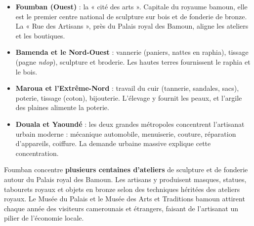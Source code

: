 \documentclass[11pt]{article}
\begin{document}
\begin{itemize}
\item \textbf{Foumban (Ouest)} : la « cité des arts ». Capitale du royaume bamoun, elle est le premier centre national de sculpture sur bois et de fonderie de bronze. La « Rue des Artisans », près du Palais royal des Bamoun, aligne les ateliers et les boutiques.
\item \textbf{Bamenda et le Nord-Ouest} : vannerie (paniers, nattes en raphia), tissage (pagne \emph{ndop}), sculpture et broderie. Les hautes terres fournissent le raphia et le bois.
\item \textbf{Maroua et l'Extrême-Nord} : travail du cuir (tannerie, sandales, sacs), poterie, tissage (coton), bijouterie. L'élevage y fournit les peaux, et l'argile des plaines alimente la poterie.
\item \textbf{Douala et Yaoundé} : les deux grandes métropoles concentrent l'artisanat urbain moderne : mécanique automobile, menuiserie, couture, réparation d'appareils, coiffure. La demande urbaine massive explique cette concentration.
\end{itemize}

\begin{exemplebox}
Foumban concentre \textbf{plusieurs centaines d'ateliers} de sculpture et de fonderie autour du Palais royal des Bamoun. Les artisans y produisent masques, statues, tabourets royaux et objets en bronze selon des techniques héritées des ateliers royaux. Le Musée du Palais et le Musée des Arts et Traditions bamoun attirent chaque année des visiteurs camerounais et étrangers, faisant de l'artisanat un pilier de l'économie locale.
\end{exemplebox}
\end{document}
